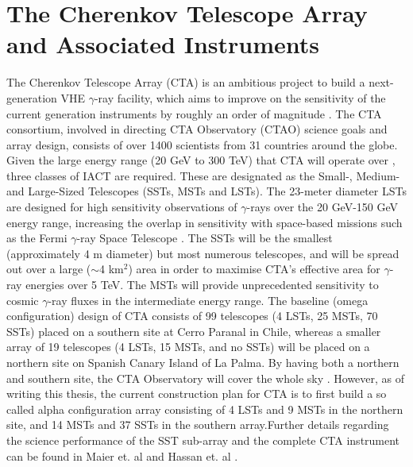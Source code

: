 \section{The Cherenkov Telescope Array and Associated Instruments}
The Cherenkov Telescope Array (CTA) is an ambitious project to build a next-generation VHE $\gamma$-ray facility, which aims to improve on the sensitivity of the current generation instruments by roughly an order of magnitude \cite{scienceCTA}. The CTA consortium, involved in directing CTA Observatory (CTAO) science goals and array design, consists of over 1400 scientists from 31 countries around the globe. Given the large energy range (20 GeV to 300 TeV) that CTA will operate  over \cite{scienceCTA}, three classes of IACT are required. These are designated as the Small-, Medium- and Large-Sized Telescopes (SSTs, MSTs and LSTs). The 23-meter diameter LSTs are designed for high sensitivity observations of $\gamma$-rays over the 20 GeV-150 GeV energy range, increasing the overlap in sensitivity with space-based missions such as the Fermi $\gamma$-ray Space Telescope \cite{Fermi}. The SSTs will be the smallest (approximately 4 m diameter) but most numerous telescopes, and will be spread out over a large ($\sim$4 km$^2$) area in order to maximise CTA's effective area for $\gamma$-ray energies over 5 TeV. The MSTs will provide unprecedented sensitivity to cosmic $\gamma$-ray fluxes in the intermediate energy range. The baseline (omega configuration) design of CTA consists of 99 telescopes (4 LSTs, 25 MSTs, 70 SSTs) placed on a southern site at Cerro Paranal in Chile, whereas a smaller array of 19 telescopes (4 LSTs, 15 MSTs, and no SSTs) will be placed on a northern site on Spanish Canary Island of La Palma. By having both a northern and southern site, the CTA Observatory will cover the whole sky \cite{scienceCTA}. However, as of writing this thesis, the current construction plan for CTA is to first build a so called alpha configuration array consisting of 4 LSTs and 9 MSTs in the northern site, and 14 MSTs and 37 SSTs in the southern array.Further details regarding the science performance of the SST sub-array and the complete CTA instrument can be found in Maier et. al \cite{gernotCTA} and Hassan et. al \cite{tarekCTA}.
